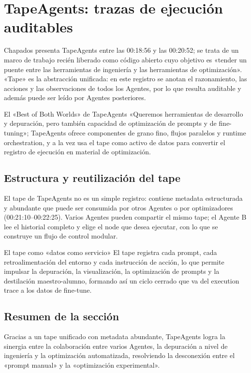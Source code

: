 \section{TapeAgents: trazas de ejecución auditables}
Chapados presenta TapeAgents entre las 00:18:56 y las 00:20:52; se trata de un marco de trabajo recién liberado como código abierto cuyo objetivo es «tender un puente entre las herramientas de ingeniería y las herramientas de optimización». «Tape» es la abstracción unificada: en este registro se anotan el razonamiento, las acciones y las observaciones de todos los Agentes, por lo que resulta auditable y además puede ser leído por Agentes posteriores.

\begin{importantbox}{El «Best of Both Worlds» de TapeAgents}
«Queremos herramientas de desarrollo y depuración, pero también capacidad de optimización de prompts y de fine-tuning»; TapeAgents ofrece componentes de grano fino, flujos paralelos y runtime orchestration, y a la vez usa el tape como activo de datos para convertir el registro de ejecución en material de optimización.
\end{importantbox}

\subsection{Estructura y reutilización del tape}
El tape de TapeAgents no es un simple registro: contiene metadata estructurada y abundante que puede ser consumida por otros Agentes o por optimizadores (00:21:10--00:22:25). Varios Agentes pueden compartir el mismo tape; el Agente B lee el historial completo y elige el node que desea ejecutar, con lo que se construye un flujo de control modular.

\begin{knowledgebox}{El tape como «datos como servicio»}
El tape registra cada prompt, cada retroalimentación del entorno y cada instrucción de acción, lo que permite impulsar la depuración, la visualización, la optimización de prompts y la destilación maestro-alumno, formando así un ciclo cerrado que va del execution trace a los datos de fine-tune.
\end{knowledgebox}

\subsection{Resumen de la sección}
Gracias a un tape unificado con metadata abundante, TapeAgents logra la sinergia entre la colaboración entre varios Agentes, la depuración a nivel de ingeniería y la optimización automatizada, resolviendo la desconexión entre el «prompt manual» y la «optimización experimental».

